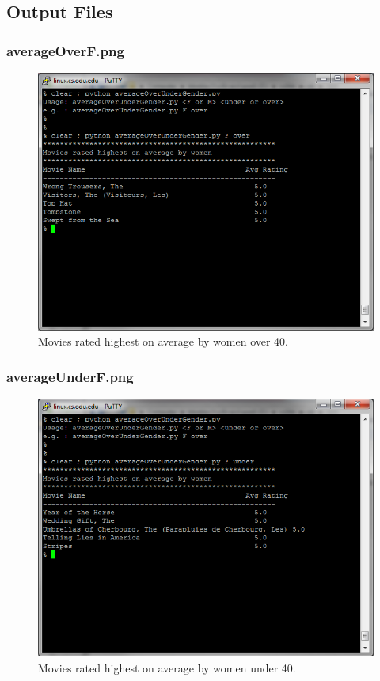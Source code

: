 \documentclass[12pt]{article}
\begin{document}
\subsection{Output Files}
\subsubsection{averageOverF.png}
\begin{figure}[ht]
\includegraphics[scale=1.0]{../Q10/averageOverF}
\centering
\caption{Movies rated highest on average by women over 40.}
\label{fig:averageOverF}
\end{figure}
\newpage
\subsubsection{averageUnderF.png}
\begin{figure}[ht]
\includegraphics[scale=1.0]{../Q10/averageUnderF}
\centering
\caption{Movies rated highest on average by women under 40.}
\label{fig:averageUnderF}
\end{figure}
\newpage
\end{document}
